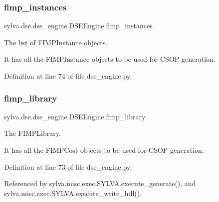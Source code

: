 \subsubsection{\texorpdfstring{fimp\+\_\+instances}{fimp\_instances}}
{\footnotesize\ttfamily sylva.\+dse.\+dse\+\_\+engine.\+D\+S\+E\+Engine.\+fimp\+\_\+instances}



The list of F\+I\+M\+P\+Instance objects. 

It has all the F\+I\+M\+P\+Instance objects to be used for C\+S\+OP generation. 

Definition at line 74 of file dse\+\_\+engine.\+py.

\mbox{\label{classsylva_1_1dse_1_1dse__engine_1_1_d_s_e_engine_a50e3da63a9a4f7e4abb5ec09db297f88}} 
\subsubsection{\texorpdfstring{fimp\+\_\+library}{fimp\_library}}
{\footnotesize\ttfamily sylva.\+dse.\+dse\+\_\+engine.\+D\+S\+E\+Engine.\+fimp\+\_\+library}



The F\+I\+M\+P\+Library. 

It has all the F\+I\+M\+P\+Cost objects to be used for C\+S\+OP generation. 

Definition at line 73 of file dse\+\_\+engine.\+py.



Referenced by sylva.\+misc.\+exec.\+S\+Y\+L\+V\+A.\+execute\+\_\+generate(), and sylva.\+misc.\+exec.\+S\+Y\+L\+V\+A.\+execute\+\_\+write\+\_\+hdl().

\mbox{\label{classsylva_1_1dse_1_1dse__engine_1_1_d_s_e_engine_aa865197f8c472c56a08e2e63eb4a3493}} 
